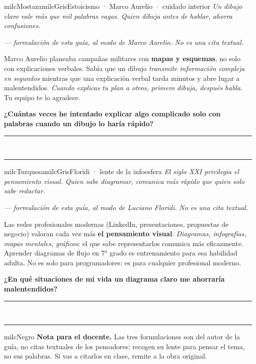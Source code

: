 \documentclass[11pt,letterpaper]{article}
\newcommand{\linead}[1]{\noindent\color{milcLinea}\rule{#1}{0.5pt}\color{milcNegro}}
\begin{document}
\begin{softbox}{milcMostaza}{milcGris}{Estoicismo · Marco Aurelio · cuidado interior}
\textit{Un dibujo claro vale más que mil palabras vagas. Quien dibuja antes de hablar, ahorra confusiones.}

{\footnotesize\itshape\color{milcNegro!70}--- formulación de esta guía, al modo de Marco Aurelio. No es una cita textual.}

Marco Aurelio planeaba campañas militares con \textbf{mapas y esquemas}, no solo con explicaciones verbales. Sabía que un dibujo \emph{transmite información compleja en segundos} mientras que una explicación verbal tarda minutos y abre lugar a malentendidos. \emph{Cuando explicas tu plan a otros, primero dibuja, después habla}. Tu equipo te lo agradece.

\textbf{¿Cuántas veces he intentado explicar algo complicado solo con palabras cuando un dibujo lo haría rápido?}
\end{softbox}
\linead{\linewidth}\\[1mm]
\linead{\linewidth}

\begin{softbox}{milcTurquesa}{milcGris}{Floridi · lente de la infoesfera}
\textit{El siglo XXI privilegia el pensamiento visual. Quien sabe diagramar, comunica más rápido que quien solo sabe redactar.}

{\footnotesize\itshape\color{milcNegro!70}--- formulación de esta guía, al modo de Luciano Floridi. No es una cita textual.}

Las redes profesionales modernas (LinkedIn, presentaciones, propuestas de negocio) valoran cada vez más \textbf{el pensamiento visual}. \emph{Diagramas, infografías, mapas mentales, gráficos}: el que sabe representarlos comunica más eficazmente. Aprender diagramas de flujo en 7° grado es entrenamiento para esa habilidad adulta. No es solo para programadores: es para cualquier profesional moderno.

\textbf{¿En qué situaciones de mi vida un diagrama claro me ahorraría malentendidos?}
\end{softbox}
\linead{\linewidth}\\[1mm]
\linead{\linewidth}

\begin{infoband}{milcNegro}
\textbf{Nota para el docente.} Las tres formulaciones son del autor de la guía, no citas textuales de los pensadores: recogen su lente para pensar el tema, no sus palabras. Si vas a citarlos en clase, remite a la obra original.
\end{infoband}
\end{document}
